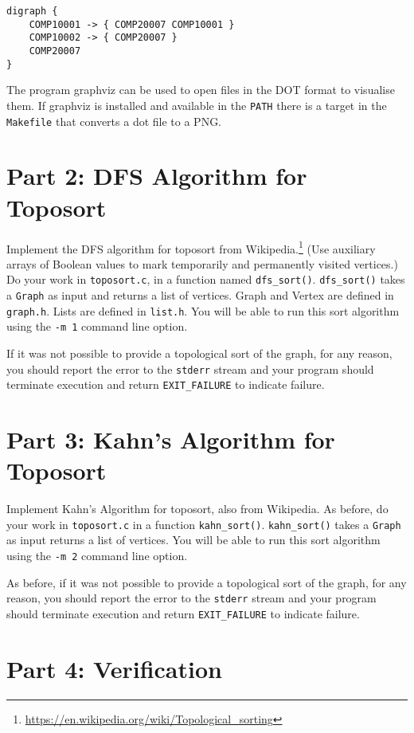 \documentclass[11pt]{article}
\begin{document}
\begin{verbatim}
digraph {
    COMP10001 -> { COMP20007 COMP10001 }
    COMP10002 -> { COMP20007 }
    COMP20007
}
\end{verbatim}

The program graphviz can be used to open files in the DOT format to visualise them.
If graphviz is installed and available in the \texttt{PATH} there is a target in the \texttt{Makefile} that converts a dot file to a PNG\@.

\section*{Part 2: DFS Algorithm for Toposort}

Implement the DFS algorithm for toposort from Wikipedia.\footnote{\url{https://en.wikipedia.org/wiki/Topological_sorting}}
(Use auxiliary arrays of Boolean values to mark temporarily and permanently visited vertices.)
Do your work in \texttt{toposort.c}, in a function named \texttt{dfs\_sort()}.
\texttt{dfs\_sort()} takes a \texttt{Graph} as input and returns a list of vertices.
Graph and Vertex are defined in \texttt{graph.h}. Lists are defined in \texttt{list.h}.
You will be able to run this sort algorithm using the \texttt{-m 1} command line option.

If it was not possible to provide a topological sort of the graph, for any reason,
you should report the error to the \texttt{stderr} stream and your
program should terminate execution and return \texttt{EXIT\_FAILURE} to indicate failure.

\section*{Part 3: Kahn's Algorithm for Toposort}

Implement Kahn's Algorithm for toposort, also from Wikipedia.
As before, do your work in \texttt{toposort.c} in a function \texttt{kahn\_sort()}.
\texttt{kahn\_sort()} takes a \texttt{Graph} as input returns a list of vertices.
You will be able to run this sort algorithm using the \texttt{-m 2} command line option.

As before, if it was not possible to provide a topological sort of the graph, for any reason,
you should report the error to the \texttt{stderr} stream and your
program should terminate execution and return \texttt{EXIT\_FAILURE} to indicate failure.

\section*{Part 4: Verification}
\end{document}
